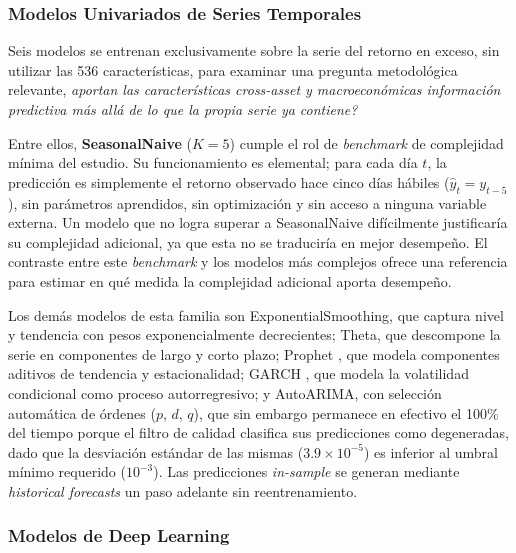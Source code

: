 ﻿\documentclass[11pt,a4paper]{article}
\begin{document}
\subsubsection{Modelos Univariados de Series Temporales}

Seis modelos se entrenan exclusivamente sobre la serie del retorno en exceso, sin utilizar las 536 caracter\'isticas, para examinar una pregunta metodol\'ogica relevante, \textit{\textquestiondown aportan las caracter\'isticas cross-asset y macroecon\'omicas informaci\'on predictiva m\'as all\'a de lo que la propia serie ya contiene?}

Entre ellos, \textbf{SeasonalNaive} ($K{=}5$) cumple el rol de \textit{benchmark} de complejidad m\'inima del estudio. Su funcionamiento es elemental; para cada d\'ia $t$, la predicci\'on es simplemente el retorno observado hace cinco d\'ias h\'abiles ($\hat{y}_t = y_{t-5}$), sin par\'ametros aprendidos, sin optimizaci\'on y sin acceso a ninguna variable externa. Un modelo que no logra superar a SeasonalNaive dif\'icilmente justificar\'ia su complejidad adicional, ya que esta no se traducir\'ia en mejor desempe\~no. El contraste entre este \textit{benchmark} y los modelos m\'as complejos ofrece una referencia para estimar en qu\'e medida la complejidad adicional aporta desempe\~no.

Los dem\'as modelos de esta familia son ExponentialSmoothing, que captura nivel y tendencia con pesos exponencialmente decrecientes; Theta, que descompone la serie en componentes de largo y corto plazo; Prophet \citep{taylor2018}, que modela componentes aditivos de tendencia y estacionalidad; GARCH \citep{bollerslev1986}, que modela la volatilidad condicional como proceso autorregresivo; y AutoARIMA, con selecci\'on autom\'atica de \'ordenes ($p$, $d$, $q$), que sin embargo permanece en efectivo el 100\% del tiempo porque el filtro de calidad clasifica sus predicciones como degeneradas, dado que la desviaci\'on est\'andar de las mismas ($3.9 \times 10^{-5}$) es inferior al umbral m\'inimo requerido ($10^{-3}$). Las predicciones \textit{in-sample} se generan mediante \textit{historical forecasts} un paso adelante sin reentrenamiento.

\subsubsection{Modelos de Deep Learning}
\end{document}
